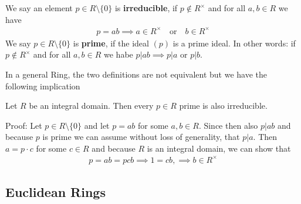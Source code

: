 \begin{definition}
	We say an element $p \in R \setminus \{0\}$ is \textbf{irreducible}, if $p \notin R^\times$ and for all $a,b \in R$ we have
	\begin{align*}
		p = ab \implies a \in R^{\times} \quad \text{or} \quad b \in R^{\times}
	\end{align*}
	We say $p \in R \setminus \{0\}$ is \textbf{prime}, if the ideal $(p)$ is a prime ideal. In other words: if $p \notin R^{\times}$ and for all $a,b \in R$ we habe $p|ab \implies p|a$ or $p|b$.
\end{definition}
In a general Ring, the two definitions are not equivalent but we have the following implication
\begin{lemma}[]
	Let $R$ be an integral domain. Then every $p \in R$ prime is also irreducible.
\end{lemma}
Proof: Let $p \in R \setminus\{0\}$ and let $p = ab$ for some $a,b \in R$. Since then also $p | ab$ and because $p$ is prime we can assume without loss of generality, that $p |a$. Then $a = p \cdot c$ for some $c \in R$ and because $R$ is an integral domain, we can show that
\begin{align*}
	p = a b = p c b \implies 1 = cb, \implies b \in R^{\times}
\end{align*}


\subsection{Euclidean Rings}

